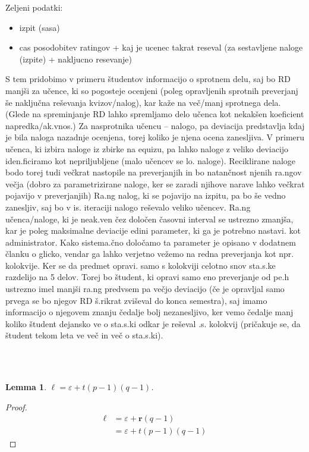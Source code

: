 \documentclass{IEEEtran}
\newcommand{\B}[1]{\ensuremath{\boldsymbol{#1}}}
\newtheorem{lemma}[theorem]{Lemma}
\begin{document}
Zeljeni podatki:
\begin{itemize}
    \item izpit (sasa)
    \item cas posodobitev ratingov + kaj je ucenec takrat reseval (za sestavljene naloge (izpite) + nakljucno resevanje)
\end{itemize}
\fi
S tem pridobimo v primeru študentov informacijo o sprotnem delu, saj bo RD manjši za učence, ki so pogosteje ocenjeni (poleg opravljenih sprotnih preverjanj še naključna reševanja kvizov/nalog), kar kaže na več/manj sprotnega dela.
(Glede na spreminjanje RD lahko spremljamo delo učenca kot nekakšen koeficient napredka/ak.vnos.)
Za nasprotnika učencu – nalogo, pa deviacija predstavlja kdaj je bila naloga nazadnje ocenjena, torej koliko je njena ocena zanesljiva. V primeru učenca, ki izbira naloge iz zbirke na equizu, pa lahko naloge z veliko deviacijo iden.ficiramo kot nepriljubljene (malo učencev se lo. naloge).
Reciklirane naloge bodo torej tudi večkrat nastopile na preverjanjih in bo natančnost njenih ra.ngov večja (dobro za parametrizirane naloge, ker se zaradi njihove narave lahko večkrat pojavijo v preverjanjih)
Ra.ng nalog, ki se pojavijo na izpitu, pa bo še vedno zanesljiv, saj bo v is. iteraciji nalogo reševalo veliko učencev.
Ra.ng učenca/naloge, ki je neak.ven čez določen časovni interval se ustrezno zmanjša, kar je poleg maksimalne deviacije edini parameter, ki ga je potrebno nastavi. kot administrator. Kako sistema.čno določamo ta parameter je opisano v dodatnem članku o glicko, vendar ga lahko verjetno vežemo na redna preverjanja kot npr. kolokvije. Ker se da predmet opravi. samo s kolokviji celotno snov sta.s.ke razdelijo na 5 delov. Torej bo študent, ki opravi samo eno preverjanje od pe.h ustrezno imel manjši ra.ng predvsem pa večjo deviacijo (če je opravljal samo prvega se bo njegov RD š.rikrat zviševal do konca semestra), saj imamo informacijo o njegovem znanju čedalje bolj nezanesljivo, ker vemo čedalje manj koliko študent dejansko ve o sta.s.ki odkar je reševal .s. kolokvij (pričakuje se, da študent tekom leta ve več in več o sta.s.ki).


\hfill
\\
\\
\begin{lemma} \label{lem:eps}
$\ell = \varepsilon + t(p-1)(q-1)$.
\end{lemma}

\begin{proof}
\begin{align*}
\ell &= \varepsilon + \B{r}(q-1) \\
&= \varepsilon + t(p-1)(q-1)
\end{align*}
\end{proof}
\end{document}
